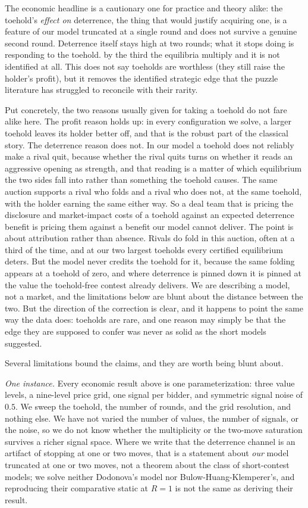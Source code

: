 \documentclass[11pt,a4paper]{article}
\begin{document}
The economic headline is a cautionary one for practice and theory alike: the toehold's \emph{effect on} deterrence, the thing that would justify acquiring one, is a feature of our model truncated at a single round and does not survive a genuine second round. Deterrence itself stays high at two rounds; what it stops doing is responding to the toehold. by the third the equilibria multiply and it is not identified at all. This does not say toeholds are worthless (they still raise the holder's profit), but it removes the identified strategic edge that the puzzle literature has struggled to reconcile with their rarity.

Put concretely, the two reasons usually given for taking a toehold do not fare alike here. The profit reason holds up: in every configuration we solve, a larger toehold leaves its holder better off, and that is the robust part of the classical story. The deterrence reason does not. In our model a toehold does not reliably make a rival quit, because whether the rival quits turns on whether it reads an aggressive opening as strength, and that reading is a matter of which equilibrium the two sides fall into rather than something the toehold causes. The same auction supports a rival who folds and a rival who does not, at the same toehold, with the holder earning the same either way. So a deal team that is pricing the disclosure and market-impact costs of a toehold against an expected deterrence benefit is pricing them against a benefit our model cannot deliver. The point is about attribution rather than absence. Rivals do fold in this auction, often at a third of the time, and at our two largest toeholds every certified equilibrium deters. But the model never credits the toehold for it, because the same folding appears at a toehold of zero, and where deterrence is pinned down it is pinned at the value the toehold-free contest already delivers. We are describing a model, not a market, and the limitations below are blunt about the distance between the two. But the direction of the correction is clear, and it happens to point the same way the data does: toeholds are rare, and one reason may simply be that the edge they are supposed to confer was never as solid as the short models suggested.

Several limitations bound the claims, and they are worth being blunt about.

\emph{One instance.} Every economic result above is one parameterization: three value levels, a nine-level price grid, one signal per bidder, and symmetric signal noise of $0.5$. We sweep the toehold, the number of rounds, and the grid resolution, and nothing else. We have not varied the number of values, the number of signals, or the noise, so we do not know whether the multiplicity or the two-move saturation survives a richer signal space. Where we write that the deterrence channel is an artifact of stopping at one or two moves, that is a statement about \emph{our} model truncated at one or two moves, not a theorem about the class of short-contest models; we solve neither Dodonova's model nor Bulow-Huang-Klemperer's, and reproducing their comparative static at $R=1$ is not the same as deriving their result.
\end{document}

